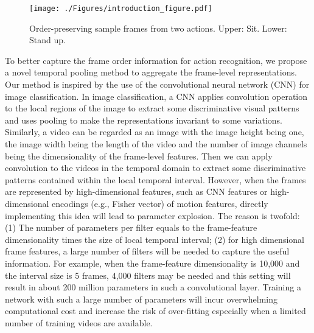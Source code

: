 \documentclass[journal]{IEEEtran}
\begin{document}
\begin{figure*}[t]
\begin{center}
\captionsetup{justification=centering}
\texttt{[image: ./Figures/introduction\_figure.pdf]}
\end{center}
   \caption{Order-preserving sample frames from two actions. Upper: Sit. Lower: Stand up.}
\label{fig:intro}
\end{figure*}

To better capture the frame order information for action recognition, we propose a novel temporal pooling method to aggregate the frame-level representations. Our method is inspired by the use of the convolutional neural network (CNN) for image classification. In image classification, a CNN applies convolution operation to the local regions of the image to extract some discriminative visual patterns and uses pooling to make the representations invariant to some variations. Similarly,
%
%
%
a video can be regarded as an image with the image height being one, the image width being the length of the video and the number of image channels being the dimensionality of the frame-level features. Then we can apply convolution to the videos in the temporal domain to extract some discriminative patterns contained within the local temporal interval. However, when the frames are represented by high-dimensional features, such as CNN features or high-dimensional encodings (e.g., Fisher vector) of motion features, directly implementing this idea will lead to parameter explosion. The reason is twofold: (1) The number of parameters per filter equals to the frame-feature dimensionality times the size of local temporal interval; (2) for high dimensional frame features, a large number of filters will be needed to capture the useful information.
%
For example, when the frame-feature dimensionality is 10,000 and the interval size is 5 frames, 4,000 filters may be needed and this setting will result in about 200 million parameters in such a convolutional layer.
Training a network with such a large number of parameters will incur overwhelming computational cost and increase the risk of over-fitting especially when a limited number of training videos are available.
\end{document}
